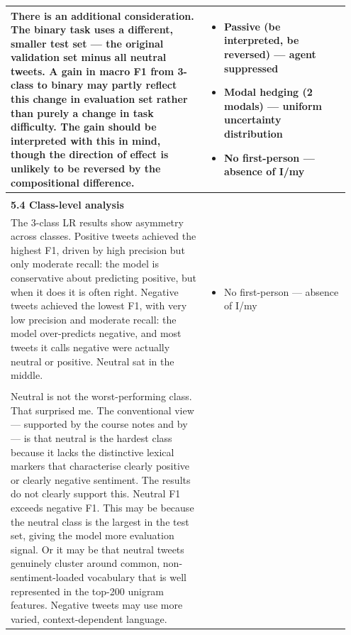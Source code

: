 \documentclass[11pt]{article}
\begin{document}
\begin{longtable}{|p{0.55\linewidth}|p{0.40\linewidth}|}
\hline
There is an additional consideration. The binary task uses a different, smaller test set --- the original validation set minus all neutral tweets. A gain in macro F1 from 3-class to binary may partly reflect this change in evaluation set rather than purely a change in task difficulty. The gain should be interpreted with this in mind, though the direction of effect is unlikely to be reversed by the compositional difference. & \begin{itemize}[leftmargin=1em,itemsep=1pt,topsep=1pt,parsep=0pt]
  \item Passive (be interpreted, be reversed) --- agent suppressed
  \item Modal hedging (2 modals) --- uniform uncertainty distribution
  \item No first-person --- absence of I/my
\end{itemize} \\[2pt]
\hline
\rule[-3.5cm]{0pt}{3.5cm} & \\
\hline
\textbf{5.4 Class-level analysis}\\[4pt]
The 3-class LR results show asymmetry across classes. Positive tweets achieved the highest F1, driven by high precision but only moderate recall: the model is conservative about predicting positive, but when it does it is often right. Negative tweets achieved the lowest F1, with very low precision and moderate recall: the model over-predicts negative, and most tweets it calls negative were actually neutral or positive. Neutral sat in the middle. & \begin{itemize}[leftmargin=1em,itemsep=1pt,topsep=1pt,parsep=0pt]
  \item No first-person --- absence of I/my
\end{itemize} \\[2pt]
\hline
\rule[-3.5cm]{0pt}{3.5cm} & \\
\hline
Neutral is not the worst-performing class. That surprised me. The conventional view --- supported by the course notes and by --- is that neutral is the hardest class because it lacks the distinctive lexical markers that characterise clearly positive or clearly negative sentiment. The results do not clearly support this. Neutral F1 exceeds negative F1. This may be because the neutral class is the largest in the test set, giving the model more evaluation signal. Or it may be that neutral tweets genuinely cluster around common, non-sentiment-loaded vocabulary that is well represented in the top-200 unigram features. Negative tweets may use more varied, context-dependent language. & \begin{itemize}[leftmargin=1em,itemsep=1pt,topsep=1pt,parsep=0pt]

\end{itemize}
\end{longtable}
\end{document}
